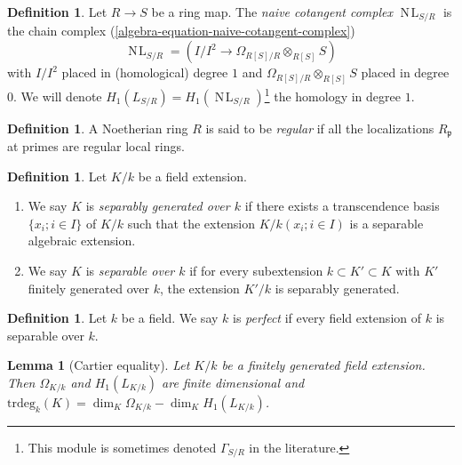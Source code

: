 \documentclass{amsart}
\theoremstyle{plain}
\newtheorem{lemma}[subsection]{Lemma}
\theoremstyle{definition}
\newtheorem{definition}[subsection]{Definition}
\theoremstyle{remark}
\numberwithin{equation}{subsection}
\def\NL{\mathop{N\!L}\nolimits}
\begin{document}
\begin{definition}
\label{algebra-definition-naive-cotangent-complex}
Let $R \to S$ be a ring map. The {\it naive cotangent complex}
$\NL_{S/R}$ is the chain complex (\ref{algebra-equation-naive-cotangent-complex})
$$
\NL_{S/R} = \left(I/I^2 \longrightarrow \Omega_{R[S]/R} \otimes_{R[S]} S\right)
$$
with $I/I^2$ placed in (homological) degree $1$ and
$\Omega_{R[S]/R} \otimes_{R[S]} S$ placed in degree $0$. We will denote
$H_1(L_{S/R}) = H_1(\NL_{S/R})$\footnote{This module is sometimes
denoted $\Gamma_{S/R}$ in the literature.} the homology in degree $1$.
\end{definition}

\begin{definition}
\label{algebra-definition-regular}
A Noetherian ring $R$ is said to be {\it regular}
if all the localizations $R_{\mathfrak p}$ at primes are
regular local rings.
\end{definition}

\begin{definition}
\label{algebra-definition-separable-field-extension}
Let $K/k$ be a field extension.
\begin{enumerate}
\item We say $K$ is {\it separably generated over $k$} if there exists
a transcendence basis $\{x_i; i \in I\}$ of $K/k$ such that the extension
$K/k(x_i; i \in I)$ is a separable algebraic extension.
\item We say $K$ is {\it separable over $k$} if for every subextension
$k \subset K' \subset K$ with $K'$ finitely generated
over $k$, the extension $K'/k$ is separably generated.
\end{enumerate}
\end{definition}

\begin{definition}
\label{algebra-definition-perfect}
Let $k$ be a field. We say $k$ is {\it perfect}
if every field extension of $k$ is separable over $k$.
\end{definition}

\begin{lemma}[Cartier equality]
\label{lemma-cartier-equality}
Let $K/k$ be a finitely generated field extension.
Then $\Omega_{K/k}$ and $H_1(L_{K/k})$ are finite dimensional and
$\text{trdeg}_k(K) = \dim_K \Omega_{K/k} - \dim_K H_1(L_{K/k})$.
\end{lemma}
\end{document}
